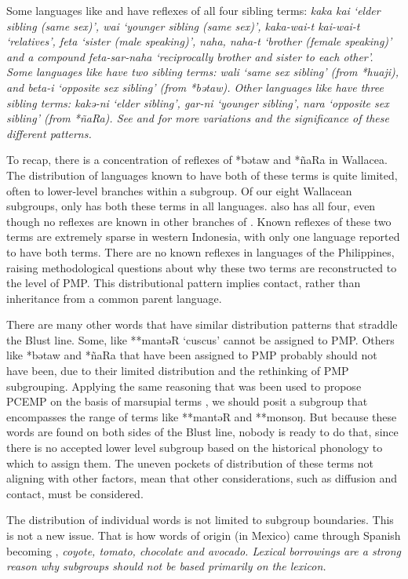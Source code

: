 Some languages like 
and  have reflexes of all four sibling terms: \it{kaka
{\tl} kai} ‘elder sibling (same sex)’,
\it{wai} ‘younger sibling (same sex)’,
\it{kaka-wai-t {\tl} kai-wai-t} ‘relatives’,
\it{feta} ‘sister (male speaking)’,
\it{naha, naha-t} ‘brother (female speaking)’
and a compound \it{feta-sar-naha} ‘reciprocally brother
and sister to each other’.
Some languages like  have two sibling terms: \it{wali} ‘same
sex sibling’ (from *huaji),
and \it{beta-i} ‘opposite sex sibling’ (from *bətaw).
Other languages like  have three sibling terms: \it{kakə-ni}
‘elder sibling’, \it{gar-ni} ‘younger sibling’, \it{nara} ‘opposite sex sibling’ (from *ñaRa).
See \citet{Fox2015} and  for more variations
and the significance of these different patterns.

To recap, there is a concentration of reflexes of *bətaw
and *ñaRa in Wallacea.
The distribution of languages known to have both of these terms
is quite limited, often to lower-level branches within a subgroup.
Of our eight Wallacean subgroups,
only  has both these terms in all languages.
 also has all four,
even though no reflexes are known in other branches of .
Known reflexes of these two terms are extremely sparse in western
Indonesia, with only one language reported to have both terms.
There are no known reflexes in languages of the Philippines,
raising methodological questions about why these two terms are
reconstructed to the level of PMP.
This distributional pattern implies contact,
rather than inheritance from a common parent language.

There are many other words that have similar distribution patterns
that straddle the Blust line.
Some, like **mantəR ‘cuscus’ cannot be assigned to PMP.
Others like *bətaw and *ñaRa that have been assigned to PMP probably
should not have been,
due to their limited distribution
and the rethinking of PMP subgrouping.
Applying the same reasoning that was been used to propose PCEMP
on the basis of marsupial terms \citep{Blust1982,Blust2012b},
we should posit a subgroup that encompasses the range
of terms like **mantəR and **monsoŋ.
But because these words are found on both sides of the Blust
line, nobody is ready to do that,
since there is no accepted lower level subgroup based on the
historical phonology to which to assign them.
The uneven pockets of distribution of these terms not aligning
with other factors, mean that other considerations,
such as diffusion and contact, must be considered.

The distribution of individual words is not limited to subgroup boundaries.
This is not a new issue.
That is how words of  origin (in Mexico) came through
Spanish becoming , \it{coyote, tomato, chocolate} and \it{avocado}.
Lexical borrowings are a strong reason why subgroups should not
be based primarily on the lexicon.